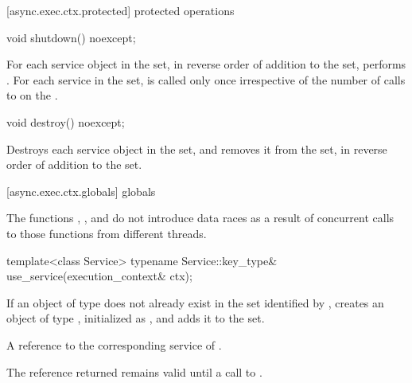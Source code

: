 [async.exec.ctx.protected]{ protected operations}

%
\begin{itemdecl}
void shutdown() noexcept;
\end{itemdecl}

\begin{itemdescr}
\pnum
\effects For each service object  in the  set, in reverse order of addition to the set, performs . For each service in the set,  is called only once irrespective of the number of calls to  on the .
\end{itemdescr}

\begin{itemdecl}
void destroy() noexcept;
\end{itemdecl}

\begin{itemdescr}
\pnum
\effects Destroys each service object in the  set, and removes it from the set, in reverse order of addition to the set.
\end{itemdescr}



[async.exec.ctx.globals]{ globals}

\pnum
The functions , , and  do not introduce data races as a result of concurrent calls to those functions from different threads.

%
\begin{itemdecl}
template<class Service> typename Service::key_type&
  use_service(execution_context& ctx);
\end{itemdecl}

\begin{itemdescr}
\pnum
\effects If an object of type  does not already exist in the  set identified by , creates an object of type , initialized as , and adds it to the set.

\pnum
\returns A reference to the corresponding service of .

\pnum
\remarks The reference returned remains valid until a call to .
\end{itemdescr}

